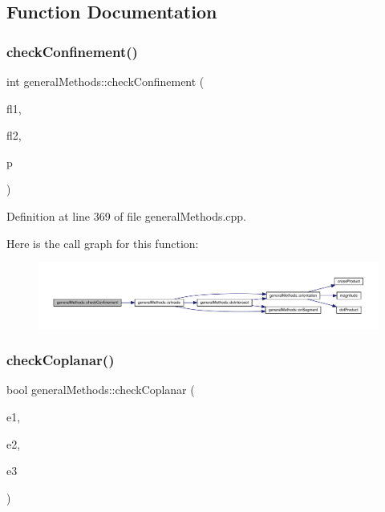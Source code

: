 \subsection{Function Documentation}
\mbox{\label{namespacegeneral_methods_a2bb810600ec90ec064ea8496ee0ab862}} 
\subsubsection{\texorpdfstring{check\+Confinement()}{checkConfinement()}}
{\footnotesize\ttfamily int general\+Methods\+::check\+Confinement (\begin{DoxyParamCaption}\item[{basic\+Loop\+Edge\+Set}]{fl1,  }\item[{basic\+Loop\+Edge\+Set}]{fl2,  }\item[{plane}]{p }\end{DoxyParamCaption})}



Definition at line 369 of file general\+Methods.\+cpp.

Here is the call graph for this function\+:
\nopagebreak
\begin{figure}[H]
\begin{center}
\leavevmode
\includegraphics[width=350pt]{namespacegeneral_methods_a2bb810600ec90ec064ea8496ee0ab862_cgraph}
\end{center}
\end{figure}
\mbox{\label{namespacegeneral_methods_a508d15a0c76920dc4f98cf8da254f9c4}} 
\subsubsection{\texorpdfstring{check\+Coplanar()}{checkCoplanar()}}
{\footnotesize\ttfamily bool general\+Methods\+::check\+Coplanar (\begin{DoxyParamCaption}\item[{edge3D}]{e1,  }\item[{edge3D}]{e2,  }\item[{edge3D}]{e3 }\end{DoxyParamCaption})}



